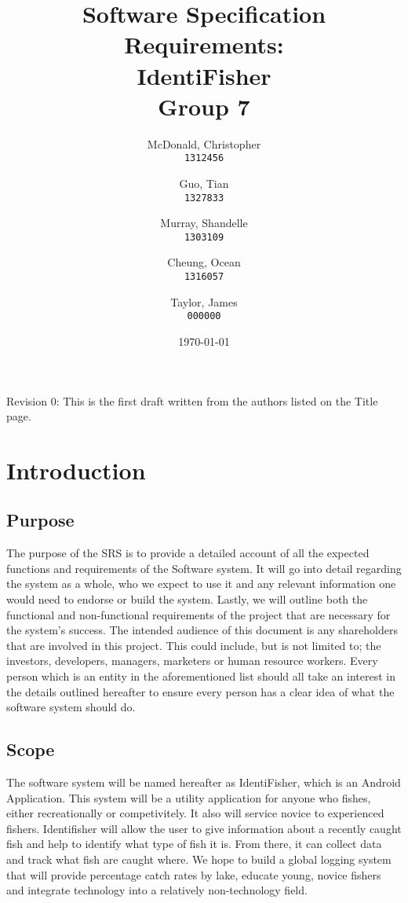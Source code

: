 \documentclass{article}
\title{Software Specification Requirements: \\ IdentiFisher \\ Group 7}
\author{
McDonald, Christopher\\
\texttt{1312456}
\and
Guo, Tian\\
\texttt{1327833}
\and
Murray, Shandelle\\
\texttt{1303109}
\and
Cheung, Ocean\\
\texttt{1316057}
\and
Taylor, James\\
\texttt{000000}
}
\date{\today}
\begin{document}
\maketitle

\newpage

\tableofcontents

\vspace*{\fill}
Revision 0: This is the first draft written from the authors listed on the Title page.

\section{Introduction}

\subsection{Purpose}
The purpose of the SRS is to provide a detailed account of all the expected functions
and requirements of the Software system. It will go into detail regarding the system
as a whole, who we expect to use it and any relevant information one would need
to endorse or build the system. Lastly, we will outline both the functional and
non-functional requirements of the project that are necessary for the system's
success. The intended audience of this document is any shareholders that are involved in this
project. This could include, but is not limited to; the investors, developers, managers,
marketers or human resource workers. Every person which is an entity in the aforementioned
list should all take an interest in the details outlined hereafter to ensure every person
has a clear idea of what the software system should do.

\subsection{Scope}
The software system will be named hereafter as IdentiFisher, which is an Android Application.
This system will be a utility application for anyone who fishes, either recreationally or
competivitely. It also will service novice to experienced fishers. Identifisher will allow
the user to give information about a recently caught fish and help to identify what type
of fish it is. From there, it can collect data and track what fish are caught where. We
hope to build a global logging system that will provide percentage catch rates by lake,
educate young, novice fishers and integrate technology into a relatively non-technology field.
\end{document}
